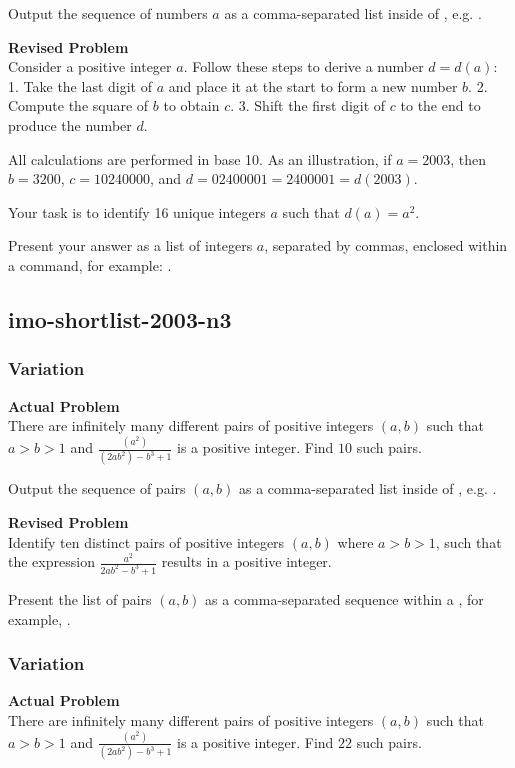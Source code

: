 Output the sequence of numbers $a$ as a comma-separated list inside of \boxed, e.g. .

\textbf{Revised Problem}\\
Consider a positive integer \(a\). Follow these steps to derive a number \(d = d(a)\):
1. Take the last digit of \(a\) and place it at the start to form a new number \(b\).
2. Compute the square of \(b\) to obtain \(c\).
3. Shift the first digit of \(c\) to the end to produce the number \(d\).

All calculations are performed in base 10. As an illustration, if \(a = 2003\), then \(b = 3200\), \(c = 10240000\), and \(d = 02400001 = 2400001 = d(2003)\).

Your task is to identify 16 unique integers \(a\) such that \(d(a) = a^2\).

Present your answer as a list of integers \(a\), separated by commas, enclosed within a \boxed command, for example: .

\subsection{imo-shortlist-2003-n3}
\subsubsection{Variation}
\textbf{Actual Problem}\\
There are infinitely many different pairs of positive integers $(a,b)$ such that $a>b>1$ and $\frac{(a^2)}{(2ab^2) - b^3 + 1}$ is a positive integer. Find $10$ such pairs.

Output the sequence of pairs $(a,b)$ as a comma-separated list inside of \boxed, e.g. .

\textbf{Revised Problem}\\
Identify ten distinct pairs of positive integers \( (a, b) \) where \( a > b > 1 \), such that the expression \( \frac{a^2}{2ab^2 - b^3 + 1} \) results in a positive integer.

Present the list of pairs \( (a, b) \) as a comma-separated sequence within a \boxed, for example, .

\subsubsection{Variation}
\textbf{Actual Problem}\\
There are infinitely many different pairs of positive integers $(a,b)$ such that $a>b>1$ and $\frac{(a^2)}{(2ab^2) - b^3 + 1}$ is a positive integer. Find $22$ such pairs.

